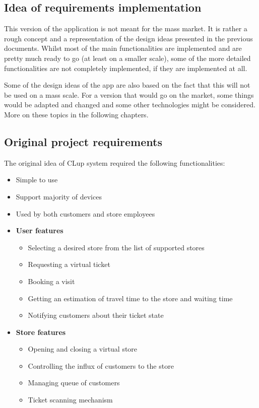 \subsection{Idea of requirements implementation}
\hspace{\parindent}This version of the application is not meant for the mass market. It is rather a rough concept and a representation of the design ideas presented in the previous documents. Whilst most of the main functionalities are implemented and are pretty much ready to go (at least on a smaller scale), some of the more detailed functionalities are not completely implemented, if they are implemented at all.

Some of the design ideas of the app are also based on the fact that this will not be used on a mass scale. For a version that would go on the market, some things would be adapted and changed and some other technologies might be considered. More on these topics in the following chapters.
\subsection{Original project requirements}
\hspace{\parindent}The original idea of CLup system required the following functionalities:
\begin{itemize}
\item Simple to use
\item Support majority of devices
\item Used by both customers and store employees 
\item \textbf{User features}
\begin{itemize}
\item Selecting a desired store from the list of supported stores
\item Requesting a virtual ticket
\item Booking a visit
\item Getting an estimation of travel time to the store and waiting time
\item Notifying customers about their ticket state
\end{itemize}
\item \textbf{Store features}
\begin{itemize}
\item Opening and closing a virtual store
\item Controlling the influx of customers to the store
\item Managing queue of customers
\item Ticket scanning mechanism
\end{itemize}
\end{itemize}
\newpage

